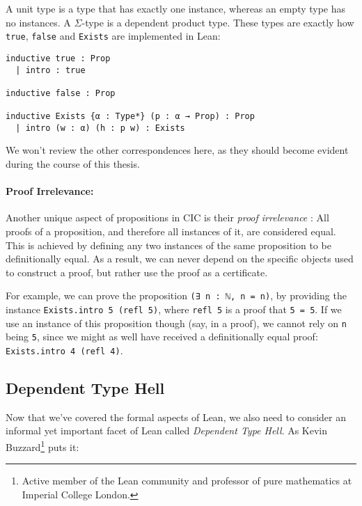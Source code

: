 \noindent A unit type is a type that has exactly one instance, whereas an empty type has no instances.
A $\Sigma$-type is a dependent product type.
These types are exactly how \lstinline{true}, \lstinline{false} and \lstinline{Exists} are implemented in Lean:

\begin{lstlisting}
inductive true : Prop
  | intro : true
  
inductive false : Prop

inductive Exists {α : Type*} (p : α → Prop) : Prop
  | intro (w : α) (h : p w) : Exists
\end{lstlisting}

\noindent We won't review the other correspondences here, as they should become evident during the course of this thesis.

\vspace*{-2mm}

\paragraph{Proof Irrelevance:}

Another unique aspect of propositions in CIC is their \emph{proof irrelevance} \cite[pp.~6-7]{mario}:
All proofs of a proposition, and therefore all instances of it, are considered equal.
This is achieved by defining any two instances of the same proposition to be definitionally equal.
As a result, we can never depend on the specific objects used to construct a proof, but rather use the proof as a certificate.

For example, we can prove the proposition \lstinline{(∃ n : ℕ, n = n)}, by providing the instance \lstinline{Exists.intro 5 (refl 5)}, where \lstinline{refl 5} is a proof that \lstinline{5 = 5}.
If we use an instance of this proposition though (say, in a proof), we cannot rely on \lstinline{n} being \lstinline{5}, since we might as well have received a definitionally equal proof: \lstinline{Exists.intro 4 (refl 4)}.

\subsection{Dependent Type Hell}
\label{section:hell}

Now that we've covered the formal aspects of Lean, we also need to consider an informal yet important facet of Lean called \emph{Dependent Type Hell}.
As Kevin Buzzard\footnote{Active member of the Lean community and professor of pure mathematics at Imperial College London.} puts it:

